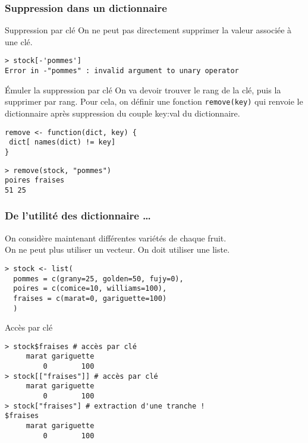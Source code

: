 \documentclass[10pt]{beamer}
\begin{document}
\begin{frame}[fragile]
  \frametitle{Suppression dans un dictionnaire}
  \begin{block}{Suppression par clé}
    On ne peut pas directement supprimer la valeur associée à une clé.
    \begin{lstlisting}[style=block]
> stock[-'pommes']
Error in -"pommes" : invalid argument to unary operator    
\end{lstlisting}

  \end{block}

\begin{alertblock}{Émuler la suppression par clé}
  On va devoir trouver le rang de la clé, puis la supprimer par rang.
  Pour cela, on définir une fonction \texttt{remove(key)} qui renvoie le dictionnaire après suppression du couple key:val du dictionnaire.
  \begin{lstlisting}
remove <- function(dict, key) {
 dict[ names(dict) != key]
}
\end{lstlisting}

\begin{lstlisting}
> remove(stock, "pommes")
poires fraises
51 25  
\end{lstlisting}  
\end{alertblock}
\end{frame}


\begin{frame}[fragile]
  \frametitle{De l'utilité des dictionnaire \dots}
  On considère maintenant différentes variétés de chaque fruit.\\
  On ne peut plus utiliser un vecteur. On doit utiliser une liste.
  \begin{lstlisting}
> stock <- list(
  pommes = c(grany=25, golden=50, fujy=0),
  poires = c(comice=10, williams=100),
  fraises = c(marat=0, gariguette=100)
  )
\end{lstlisting}

\begin{block}{Accès par clé}
  \begin{lstlisting}[style=block]
> stock$fraises # accès par clé
     marat gariguette 
         0        100 
> stock[["fraises"]] # accès par clé
     marat gariguette 
         0        100 
> stock["fraises"] # extraction d'une tranche !
$fraises
     marat gariguette 
         0        100 
  \end{lstlisting}         
\end{block}
\end{frame}
\end{document}
